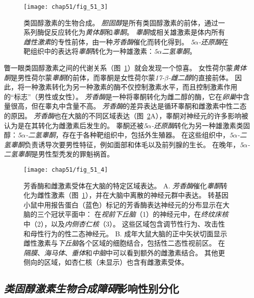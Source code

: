 \begin{figure}[htbp]
	\centering
	\texttt{[image: chap51/fig\_51\_3]}
	\caption{类固醇激素的生物合成。
		\textit{胆固醇}是所有类固醇激素的前体，通过一系列酶促反应转化为\textit{黄体酮}和\textit{睾酮}。
		\textit{睾酮}或相关雄激素是体内所有\textit{雌性激素}的专性前体，由一种\textit{芳香酶}催化而转化得到。
		\textit{5$\alpha$-还原酶}在靶组织中的表达将\textit{睾酮}转化为一种雄激素：\textit{5$ \alpha $二氢睾酮}。}
	\label{fig:51_3}
\end{figure}


瞥一眼类固醇激素之间的代谢关系（图~\ref{fig:51_3}）就会发现一个惊喜。
女性荷尔蒙\textit{黄体酮}是男性荷尔蒙\textit{睾酮}的前体，而睾酮是女性荷尔蒙\textit{17-$ \beta $-雌二醇}的直接前体。
因此，将一种激素转化为另一种激素的酶不仅控制激素水平，而且控制激素作用的“标志”（男性或女性）。
\textit{芳香酶}是一种将睾酮转化为雌二醇的酶，它在\textit{卵巢}中含量很高，但在睾丸中含量不高。
\textit{芳香酶}的差异表达是循环睾酮和雌激素中性二态的原因。
\textit{芳香酶}也在大脑的不同区域表达（图~\ref{fig:51_4}A），睾酮对神经元的许多影响被认为是在其转化为雌激素后发生的。
睾酮还被\textit{5$\alpha$-还原酶}转化为另一种雄激素类固醇：\textit{5$\alpha$-二氢睾酮}，存在于各种靶组织中，包括外生殖器。
在这些组织中，\textit{5$\alpha$-二氢睾酮}负责诱导次要男性特征，例如面部和体毛以及前列腺的生长。
在晚年，\textit{5$\alpha$-二氢睾酮}是男性型秃发的罪魁祸首。


\begin{figure}[htbp]
	\centering
	\texttt{[image: chap51/fig\_51\_4]}
	\caption{芳香酶和雌激素受体在大脑的特定区域表达。 
		A. \textit{芳香酶}催化\textit{睾酮}转化为雌性激素（图~\ref{fig:51_3}），并在大脑中离散的神经元群中表达。
		转基因小鼠中用报告蛋白（蓝色）标记的芳香酶表达神经元的分布显示在大脑的三个冠状平面中：
		在\textit{视前下丘脑}（1）的神经元中，在\textit{终纹床核}中（2），以及\textit{内侧杏仁核}（3）。
		这些区域包含调节性行为、攻击性和母性行为的性二态神经元\cite{wu2009estrogen}。
		B. 成年大鼠大脑的正中矢状切面显示雌性激素与\textit{下丘脑}各个区域的细胞结合，包括性二态性视前区。
		在\textit{隔膜}、\textit{海马体}、\textit{垂体}和\textit{中脑}中可以看到额外的雌激素结合。
		其他更侧向的区域，如杏仁核（未显示）也含有雌激素受体。}
	\label{fig:51_4}
\end{figure}



\subsection{\textit{类固醇激素生物合成障碍}影响性别分化}

